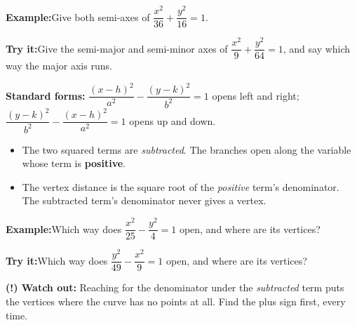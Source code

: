\documentclass[12pt]{article}
\begin{document}
\begin{examplebox}
\textbf{Example:}\quad Give both semi-axes of
$\dfrac{x^2}{36} + \dfrac{y^2}{16} = 1$.
\end{examplebox}

\begin{tryitbox}
\textbf{Try it:}\quad Give the semi-major and semi-minor axes of
$\dfrac{x^2}{9} + \dfrac{y^2}{64} = 1$, and say which way the major axis
runs.\\[2pt]
\end{tryitbox}


\begin{formulabox}
\textbf{Standard forms:} \quad
$\dfrac{(x-h)^2}{a^2} - \dfrac{(y-k)^2}{b^2} = 1$ opens left and right; \quad
$\dfrac{(y-k)^2}{b^2} - \dfrac{(x-h)^2}{a^2} = 1$ opens up and down.
\begin{itemize}[leftmargin=0.8cm, itemsep=1pt, topsep=2pt]
  \item The two squared terms are \emph{subtracted}. The branches open along the
        variable whose term is \textbf{positive}.
  \item The vertex distance is the square root of the \emph{positive} term's
        denominator. The subtracted term's denominator never gives a vertex.
\end{itemize}
\end{formulabox}

\begin{examplebox}
\textbf{Example:}\quad Which way does $\dfrac{x^2}{25} - \dfrac{y^2}{4} = 1$
open, and where are its vertices?
\end{examplebox}

\begin{tryitbox}
\textbf{Try it:}\quad Which way does $\dfrac{y^2}{49} - \dfrac{x^2}{9} = 1$
open, and where are its vertices?\\[2pt]
\end{tryitbox}

\begin{watchoutbox}
\textbf{(!) Watch out:} Reaching for the denominator under the \emph{subtracted}
term puts the vertices where the curve has no points at all. Find the plus sign
first, every time.
\end{watchoutbox}
\end{document}
